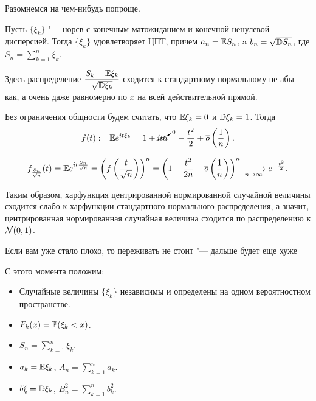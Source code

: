 \documentclass[../TV&MS.tex]{subfiles}
\begin{document}
	Разомнемся на чем-нибудь попроще.

\begin{Th}
    Пусть $\{ \xi_k \}$ "--- норсв с конечным матожиданием и конечной ненулевой 
    дисперсией. Тогда $\{ \xi_k \}$ удовлетворяет ЦПТ, причем $a_n = \mathbb{E} S_n$,
    a $b_n = \sqrt{\mathbb{D} S_n}$, где  $S_n = \sum\limits_{k=1}^{n} \xi_k$.
\end{Th}

\begin{Note}
    Здесь распределение $\dfrac{S_k - \mathbb{E} \xi_k}{\sqrt{\mathbb{D} \xi_k}}$ сходится к 
    стандартному нормальному не абы как, а очень даже равномерно по $x$ на всей 
    действительной прямой.
\end{Note} 

\begin{Proof}
    Без ограничения общности будем считать, что $\mathbb{E}\xi_k=0$ и  $\mathbb{D} \xi_k = 1$.
    Тогда 
\[
    f(t) := \mathbb{E} e^{it\xi_k} = 1 + \cancelto{\text{\scriptsize{0}}}{ita} 
    \quad - \dfrac{t^2}{2} + \overline{o} \left( \dfrac{1}{n} \right). 
\]
    
\[
    f_{\frac{S_n}{\sqrt{n}}} (t) = \mathbb{E} e^{it\frac{S_n}{\sqrt{n}}} = 
    \left( f \left( \dfrac{t}{\sqrt{n}} \right) \right)^{n} = 
    \left( 1 - \dfrac{t^2}{2n} + \overline{o} \left( \dfrac{1}{n} \right)  \right)^{n} 
	\xrightarrow[n \rightarrow \infty]{} e^{-\frac{t^2}{2}}.
\] 

    Таким образом, харфункция центрированной нормированной случайной величины сходится 
    слабо к харфункции стандартного нормального распределения, а значит, центрированная 
    нормированная случайная величина сходится по распределению к $\mathcal{N}(0, 1)$.
\end{Proof} 

\begin{Why}
    Если вам уже стало плохо, то переживать не стоит "--- дальше будет еще хуже
\end{Why} 

	С этого момента положим:
\begin{itemize}
    \item Случайные величины $\{ \xi_k \}$ независимы и определены на 
    одном вероятностном пространстве.

    \item $F_k(x) = \mathbb{P} (\xi_k < x)$.
    \item $S_n = \sum\limits_{k=1}^{n} \xi_k$.
    \item $a_k = \mathbb{E} \xi_k$, $A_n = \sum\limits_{k=1}^{n} a_k$. 
    \item $b_k^2 = \mathbb{D} \xi_k$, $B_n^2 = \sum\limits_{k=1}^{n} b_k^2$.
\end{itemize} 
\end{document}
